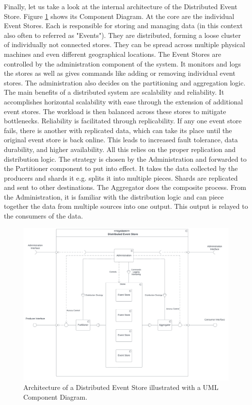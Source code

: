 Finally, let us take a look at the internal architecture of the Distributed Event Store. Figure \ref{fig:des_component} shows its Component Diagram. At the core are the individual Event Stores. Each is responsible for storing and managing data (in this context also often to referred as "Events"). They are distributed, forming a loose cluster of individually not connected stores. They can be spread across multiple physical machines and even different geographical locations. The Event Stores are controlled by the administration component of the system. It monitors and logs the stores as well as gives commands like adding or removing individual event stores. The administration also decides on the partitioning and aggregation logic. The main benefits of a distributed system are scalability and reliability. It accomplishes horizontal scalability with ease through the extension of additional event stores. The workload is then balanced across these stores to mitigate bottlenecks. Reliability is facilitated through replicability. If any one event store fails, there is another with replicated data, which can take its place until the original event store is back online. This leads to increased fault tolerance, data durability, and higher availability. All this relies on the proper replication and distribution logic. The strategy is chosen by the Administration and forwarded to the Partitioner component to put into effect. It takes the data collected by the producers and shards it e.g. splits it into multiple pieces. Shards are replicated and sent to other destinations. The Aggregator does the composite process. From the Administration, it is familiar with the distribution logic and can piece together the data from multiple sources into one output. This output is relayed to the consumers of the data.



\begin{figure}[ht]
    \begin{adjustbox}{center}
    \includegraphics[width=0.8\pdfpagewidth]{img/DES_Component_Diagram.pdf}
    \end{adjustbox}
    \caption{Architecture of a Distributed Event Store illustrated with a UML Component Diagram. \label{fig:des_component}}
\end{figure}

